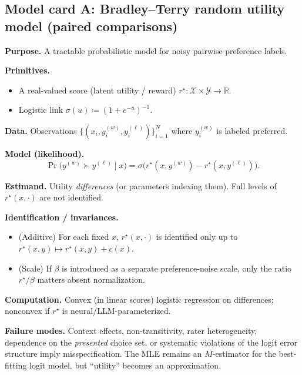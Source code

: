 \documentclass[11pt]{article}
\newcommand{\R}{\mathbb{R}}
\newcommand{\1}{\mathbf{1}}
\newcommand{\sigmoid}{\sigma}
\theoremstyle{plain}
\theoremstyle{definition}
\theoremstyle{remark}
\begin{document}
\subsection{Model card A: Bradley--Terry random utility model (paired comparisons)}
\begin{tcolorbox}[colback=white, colframe=accent, title=Model card A: Bradley--Terry (BT) / logistic paired comparison]
\textbf{Purpose.} A tractable probabilistic model for noisy pairwise preference labels.

\medskip
\textbf{Primitives.}
\begin{itemize}
\item A real-valued score (latent utility / reward) $r^\star:\mathcal{X}\times\mathcal{Y}\to\R$.
\item Logistic link $\sigmoid(u)\coloneqq(1+e^{-u})^{-1}$.
\end{itemize}

\medskip
\textbf{Data.} Observations $\{(x_i, y_i^{(w)}, y_i^{(\ell)})\}_{i=1}^N$ where $y_i^{(w)}$ is labeled preferred.

\medskip
\textbf{Model (likelihood).}
\[
\Pr\big(y^{(w)} \succ y^{(\ell)} \mid x\big)=\sigmoid\!\Big(r^\star(x,y^{(w)})-r^\star(x,y^{(\ell)})\Big).
\]

\medskip
\textbf{Estimand.} Utility \emph{differences} (or parameters indexing them). Full levels of $r^\star(x,\cdot)$ are not identified.

\medskip
\textbf{Identification / invariances.}
\begin{itemize}
\item (Additive) For each fixed $x$, $r^\star(x,\cdot)$ is identified only up to $r^\star(x,y)\mapsto r^\star(x,y)+c(x)$.
\item (Scale) If $\beta$ is introduced as a separate preference-noise scale, only the ratio $r^\star/\beta$ matters absent normalization.
\end{itemize}

\medskip
\textbf{Computation.} Convex (in linear scores) logistic regression on differences; nonconvex if $r^\star$ is
neural/LLM-parameterized.

\medskip
\textbf{Failure modes.} Context effects, non-transitivity, rater heterogeneity, dependence on the \emph{presented}
choice set, or systematic violations of the logit error structure imply misspecification. The MLE remains an
$M$-estimator for the best-fitting logit model, but ``utility'' becomes an approximation.
\end{tcolorbox}
\end{document}
